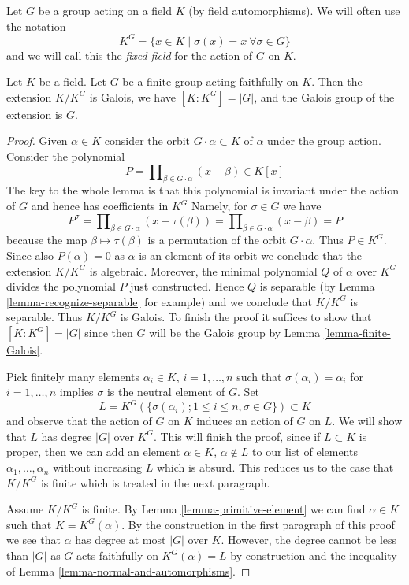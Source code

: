 \noindent
Let $G$ be a group acting on a field $K$ (by field automorphisms).
We will often use the notation
$$
K^G = \{x \in K \mid \sigma(x) = x \ \forall \sigma \in G\}
$$
and we will call this the {\it fixed field} for the action of $G$ on $K$.

\begin{lemma}
\label{lemma-galois-over-fixed-field}
Let $K$ be a field. Let $G$ be a finite group acting faithfully on $K$.
Then the extension $K/K^G$ is Galois, we have $[K : K^G] = |G|$,
and the Galois group of the extension is $G$.
\end{lemma}

\begin{proof}
Given $\alpha \in K$ consider the orbit $G \cdot \alpha \subset K$
of $\alpha$ under the group action. Consider the polynomial
$$
P = \prod\nolimits_{\beta \in G \cdot \alpha} (x - \beta) \in K[x]
$$
The key to the whole lemma is that this polynomial is invariant
under the action of $G$ and hence has coefficients in $K^G$
Namely, for $\sigma \in G$ we have
$$
P^\sigma = \prod\nolimits_{\beta \in G \cdot \alpha} (x - \tau(\beta)) =
\prod\nolimits_{\beta \in G \cdot \alpha} (x - \beta) = P
$$
because the map $\beta \mapsto \tau(\beta)$ is a permutation of
the orbit $G \cdot \alpha$. Thus $P \in K^G$. Since also
$P(\alpha) = 0$ as $\alpha$ is an element of its orbit
we conclude that the extension $K/K^G$ is algebraic. Moreover,
the minimal polynomial $Q$ of $\alpha$ over $K^G$ divides the
polynomial $P$ just constructed. Hence $Q$ is separable
(by Lemma \ref{lemma-recognize-separable} for example) and
we conclude that $K/K^G$ is separable. Thus $K/K^G$ is Galois.
To finish the proof it suffices to show that $[K : K^G] = |G|$
since then $G$ will be the Galois group by
Lemma \ref{lemma-finite-Galois}.

\medskip\noindent
Pick finitely many elements $\alpha_i \in K$, $i = 1, \ldots, n$
such that $\sigma(\alpha_i) = \alpha_i$ for $i = 1, \ldots, n$ implies
$\sigma$ is the neutral element of $G$. Set
$$
L = K^G(\{\sigma(\alpha_i); 1 \leq i \leq n, \sigma \in G\}) \subset K
$$
and observe that the action of $G$ on $K$ induces an action of $G$ on $L$.
We will show that $L$ has degree $|G|$ over $K^G$. This will finish the
proof, since if $L \subset K$ is proper, then we can add an element
$\alpha \in K$, $\alpha \not \in L$ to our list of elements
$\alpha_1, \ldots, \alpha_n$ without increasing $L$ which is absurd.
This reduces us to the case that $K/K^G$ is finite which is
treated in the next paragraph.

\medskip\noindent
Assume $K/K^G$ is finite. By Lemma \ref{lemma-primitive-element}
we can find $\alpha \in K$ such that $K = K^G(\alpha)$.
By the construction in the first paragraph of this proof we see
that $\alpha$ has degree at most $|G|$ over $K$. However, the
degree cannot be less than $|G|$ as $G$ acts faithfully on
$K^G(\alpha) = L$ by construction and the inequality of
Lemma \ref{lemma-normal-and-automorphisms}.
\end{proof}

